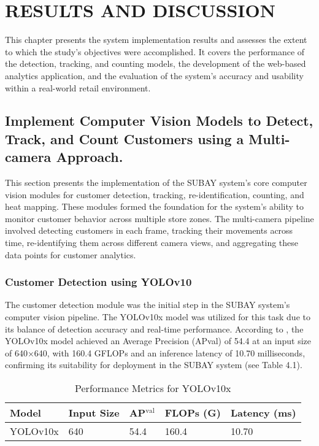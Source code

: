 \chapter{RESULTS AND DISCUSSION}
{\baselineskip
	
This chapter presents the system implementation results and assesses the extent to which the study’s objectives were accomplished. It covers the performance of the detection, tracking, and counting models, the development of the web-based analytics application, and the evaluation of the system’s accuracy and usability within a real-world retail environment.

\section{Implement Computer Vision Models to Detect, Track, and Count Customers using a Multi-camera Approach.}

This section presents the implementation of the SUBAY system’s core computer vision modules for customer detection, tracking, re-identification, counting, and heat mapping. These modules formed the foundation for the system's ability to monitor customer behavior across multiple store zones. The multi-camera pipeline involved detecting customers in each frame, tracking their movements across time, re-identifying them across different camera views, and aggregating these data points for customer analytics.

\subsection{Customer Detection using YOLOv10}

The customer detection module was the initial step in the SUBAY system’s computer vision pipeline. The YOLOv10x model was utilized for this task due to its balance of detection accuracy and real-time performance. According to \cite{Ultralytics2025}, the YOLOv10x model achieved an Average Precision (APval) of 54.4 at an input size of 640×640, with 160.4 GFLOPs and an inference latency of 10.70 milliseconds, confirming its suitability for deployment in the SUBAY system (see Table 4.1).

\begin{table}[htbp]
	\begin{doublespace}
		\centering
		\caption[Performance Metrics for YOLOv10x \citep{Ultralytics2025}]{\newline \newline Performance Metrics for YOLOv10x \citep{Ultralytics2025}}
		\begin{tabular}{|p{3cm}|p{3cm}|p{2.5cm}|p{2.5cm}|p{2.5cm}|}
			\hline
			\textbf{Model} & \textbf{Input Size} & \textbf{AP\(^\text{val}\)} & \textbf{FLOPs (G)} & \textbf{Latency (ms)} \\
			\hline
			YOLOv10x & 640 & 54.4 & 160.4 & 10.70 \\
			\hline
		\end{tabular}
	\end{doublespace}
	\label{tab:yolov10x}
\end{table}

}
